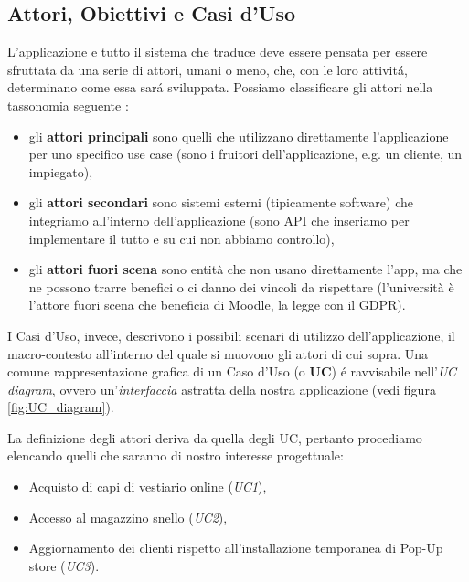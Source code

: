 \documentclass[12pt]{article}
\begin{document}
\subsection{Attori, Obiettivi e Casi d'Uso}
\label{subsec:UC}

L'applicazione e tutto il sistema che traduce deve essere pensata per essere sfruttata da una serie di attori, umani o meno, che, con le loro attivit\'a, determinano come essa sar\'a sviluppata. Possiamo classificare gli attori nella tassonomia seguente \cite{elicitation_tools}:
\begin{itemize}
    \item gli \textbf{attori principali} sono quelli che utilizzano direttamente l’applicazione per uno specifico use case (sono i fruitori dell’applicazione, e.g. un cliente, un impiegato),
    \item gli \textbf{attori secondari} sono sistemi esterni (tipicamente software) che integriamo all’interno dell’applicazione (sono API che inseriamo per implementare il tutto e su cui non abbiamo controllo),
    \item gli \textbf{attori fuori scena} sono entità che non usano direttamente l’app, ma che ne possono trarre benefici o ci danno dei vincoli da rispettare (l’università è l’attore fuori scena che beneficia di Moodle, la legge con il GDPR).
\end{itemize}

I Casi d'Uso, invece, descrivono i possibili scenari di utilizzo dell'applicazione, il macro-contesto all'interno del quale si muovono gli attori di cui sopra. Una comune rappresentazione grafica di un Caso d'Uso (o \textbf{UC}) \'e ravvisabile nell'{\em UC diagram}, ovvero un'\textit{interfaccia} astratta della nostra applicazione (vedi figura \ref{fig:UC_diagram}).


La definizione degli attori deriva da quella degli UC, pertanto procediamo elencando quelli che saranno di nostro interesse progettuale:
\begin{itemize}
    \item Acquisto di capi di vestiario online (\textit{UC1}),
    \item Accesso al magazzino snello (\textit{UC2}),
    \item Aggiornamento dei clienti rispetto all'installazione temporanea di Pop-Up store (\textit{UC3}).
\end{itemize}
\end{document}
